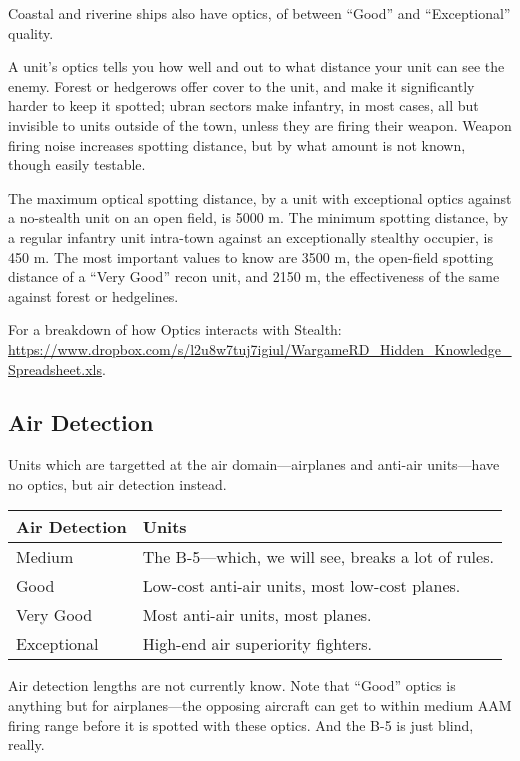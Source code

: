 \documentclass{article}
\begin{document}
Coastal and riverine ships also have optics, of between ``Good'' and
``Exceptional'' quality.

A unit's optics tells you how well and out to what distance your unit can see
the enemy. Forest or hedgerows offer cover to the unit, and make it
significantly harder to keep it spotted; ubran sectors make infantry, in most
cases, all but invisible to units outside of the town, unless they are firing
their weapon. Weapon firing noise increases spotting distance, but by what
amount is not known, though easily testable.

The maximum optical spotting distance, by a unit with exceptional optics
against a no-stealth unit on an open field, is 5000 m. The minimum spotting
distance, by a regular infantry unit intra-town against an exceptionally
stealthy occupier, is 450 m. The most important values to know are 3500 m, the
open-field spotting distance of a ``Very Good'' recon unit, and 2150 m, the
effectiveness of the same against forest or hedgelines.

For a breakdown of how Optics interacts with Stealth: 
\url{https://www.dropbox.com/s/l2u8w7tuj7igiul/WargameRD_Hidden_Knowledge_Spreadsheet.xls}.

\subsection{Air Detection}

Units which are targetted at the air domain---airplanes and anti-air
units---have no optics, but air detection instead.

\begin{center}
    \begin{tabular}{ | l | l | }
    \hline
    Air Detection & Units \\ \hline
    Medium & The B-5---which, we will see, breaks a lot of rules.\\
    Good & Low-cost anti-air units, most low-cost planes.\\
    Very Good & Most anti-air units, most planes.\\
    Exceptional & High-end air superiority fighters.\\
    \hline
    \end{tabular}
\end{center}

Air detection lengths are not currently know. Note that ``Good'' optics is
anything but for airplanes---the opposing aircraft can get to within
medium AAM firing range before it is spotted with these optics. And the B-5 is
just blind, really.
\end{document}
